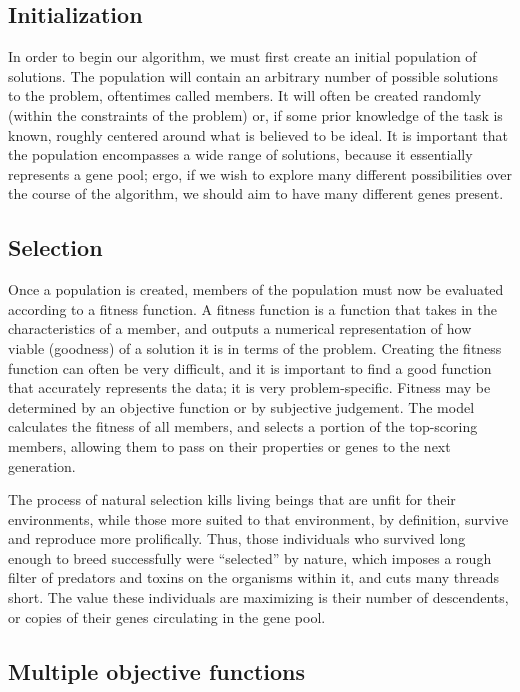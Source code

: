 \subsection{Initialization}
In order to begin our algorithm, we must first create an initial population of solutions. The population will contain an arbitrary number of possible solutions to the problem, oftentimes called members. It will often be created randomly (within the constraints of the problem) or, if some prior knowledge of the task is known, roughly centered around what is believed to be ideal. It is important that the population encompasses a wide range of solutions, because it essentially represents a gene pool; ergo, if we wish to explore many different possibilities over the course of the algorithm, we should aim to have many different genes present.

\subsection{Selection}
Once a population is created, members of the population must now be evaluated according to a fitness function. A fitness function is a function that takes in the characteristics of a member, and outputs a numerical representation of how viable (goodness) of a solution it is in terms of the problem. Creating the fitness function can often be very difficult, and it is important to find a good function that accurately represents the data; it is very problem-specific. Fitness may be determined by an objective function or by
subjective judgement. The model calculates the fitness of all members, and selects a portion of the top-scoring members, allowing them to pass on their properties or genes to the next generation.

The process of natural selection kills living beings that are unfit for their environments, while those more suited to that environment, by definition, survive and reproduce more prolifically. Thus, those individuals who survived long enough to breed successfully were “selected” by nature, which imposes a rough filter of predators and toxins on the organisms within it, and cuts many threads short. The value these individuals are maximizing is their number of descendents, or copies of their genes circulating in the gene pool.



\subsection{Multiple objective functions}

